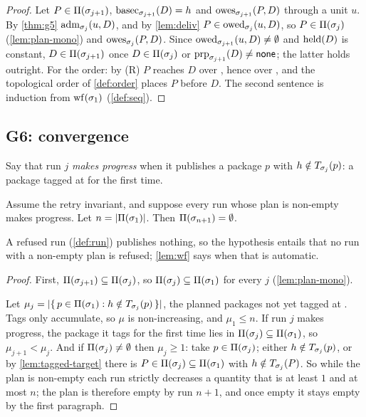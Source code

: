 \begin{proof}
Let $P \in \Pi(\sigma_{j+1})$, $\mathrm{basec}_{\sigma_{j+1}}(D) = h$ and
$\mathrm{owes}_{\sigma_{j+1}}(P,D)$ through a unit $u$. By \cref{thm:g5}
$\mathrm{adm}_{\sigma_j}(u,D)$, and by \cref{lem:deliv} $P \in \mathrm{owed}_{\sigma_j}(u,D)$, so
$P \in \Pi(\sigma_j)$ (\cref{lem:plan-mono}) and $\mathrm{owes}_{\sigma_j}(P,D)$. Since
$\mathrm{owed}_{\sigma_{j+1}}(u,D) \neq \emptyset$ and $\mathrm{held}(D)$ is constant, $D \in
\Pi(\sigma_{j+1})$ once $D \in \Pi(\sigma_j)$ or $\mathrm{prp}_{\sigma_{j+1}}(D) \neq
\mathsf{none}$; the latter holds outright. For the order: by (R) $P$ reaches $D$ over
\Kprop{}, hence over \Korder{}, and the topological order of \cref{def:order}
places $P$ before $D$. The second sentence is induction from $\mathrm{wf}(\sigma_1)$
(\cref{def:seq}).
\end{proof}

\subsection{G6: convergence}

Say that run $j$ \emph{makes progress} when it publishes a package $p$ with
$h \notin T_{\sigma_j}(p)$: a package tagged at \Head{} for the first time.

\begin{theorem}[\G{6}, convergence]
\label{thm:g6}
Assume the retry invariant, and suppose every run whose plan is non-empty
makes progress. Let $n = |\Pi(\sigma_1)|$. Then $\Pi(\sigma_{n+1}) = \emptyset$.
\end{theorem}

A refused run (\cref{def:run}) publishes nothing, so the hypothesis entails
that no run with a non-empty plan is refused; \cref{lem:wf} says when that is
automatic.

\begin{proof}
First, $\Pi(\sigma_{j+1}) \subseteq \Pi(\sigma_j)$, so $\Pi(\sigma_j) \subseteq
\Pi(\sigma_1)$ for every $j$ (\cref{lem:plan-mono}).

Let $\mu_j = |\{\,p \in \Pi(\sigma_1) : h \notin T_{\sigma_j}(p)\,\}|$, the
planned packages not yet tagged at \Head{}. Tags only accumulate, so $\mu$ is
non-increasing, and $\mu_1 \leq n$. If run $j$ makes progress, the package
it tags for the first time lies in $\Pi(\sigma_j) \subseteq \Pi(\sigma_1)$, so
$\mu_{j+1} < \mu_j$. And if $\Pi(\sigma_j) \neq \emptyset$ then $\mu_j \geq 1$:
take $p \in \Pi(\sigma_j)$; either $h \notin T_{\sigma_j}(p)$, or by
\cref{lem:tagged-target} there is $P \in \Pi(\sigma_j) \subseteq \Pi(\sigma_1)$
with $h \notin T_{\sigma_j}(P)$. So while the plan is non-empty each run
strictly decreases a quantity that is at least $1$ and at most $n$; the plan is
therefore empty by run $n+1$, and once empty it stays empty by the first
paragraph.
\end{proof}

